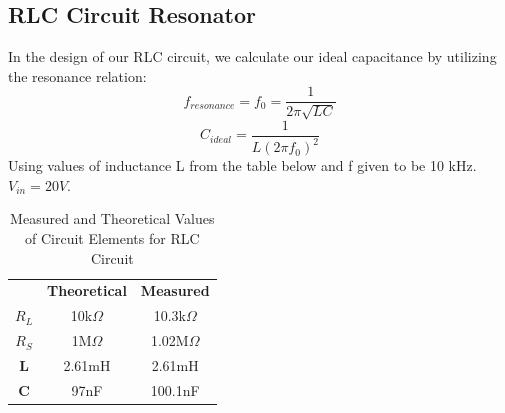 \documentclass{article}
\begin{document}
\subsection{RLC Circuit Resonator}
    In the design of our RLC circuit, we calculate our ideal capacitance by utilizing the resonance relation:
    \begin{equation}
        f_{resonance} = f_0 = \frac{1}{2\pi \sqrt{LC}}
    \end{equation}
    \begin{equation}
        C_{ideal} = \frac{1}{L(2\pi f_0)^{2}}
    \end{equation}
    Using values of inductance L from the table below and f given to be 10 kHz. $V_{in} = 20V$.
    \small
    \begin{table}[h]
    \centering
    \caption{Measured and Theoretical Values of Circuit Elements for RLC Circuit}
    \label{my-label}
    \begin{tabular}{ccc}
    \textbf{}   & \textbf{Theoretical} & \textbf{Measured} \\ \cline{2-3} 
    \textbf{$R_L$} & 10k$\Omega$             & 10.3k$\Omega$        \\
    \textbf{$R_S$} & 1M$\Omega$              & 1.02M$\Omega$        \\
    \textbf{L}  & 2.61mH               & 2.61mH            \\
    \textbf{C}  & 97nF                 & 100.1nF          
    \end{tabular}
    \end{table}
\end{document}
